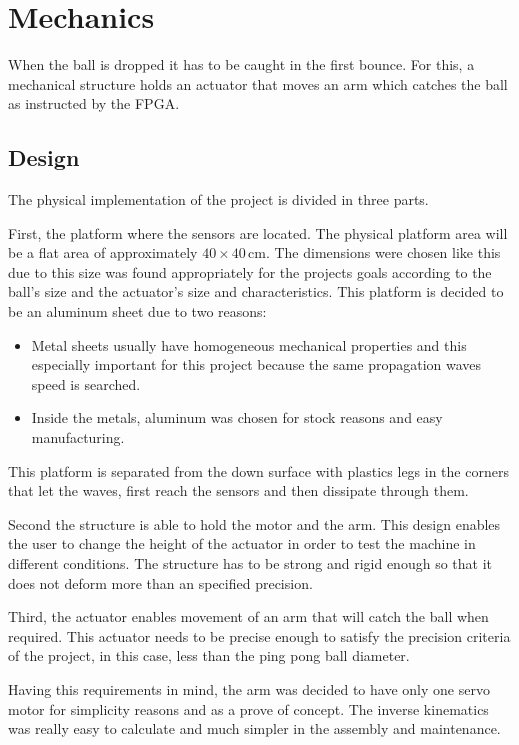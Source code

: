 \chapter{Mechanics} %
\label{chap:mechanics}
	When the ball is dropped it has to be caught in the first bounce. 
	For this, a mechanical structure holds an actuator that moves an arm which catches the ball as instructed by the FPGA.

	\section{Design} %
	\label{sec:mechanics_design}
		The physical implementation of the project is divided in three parts.

		First, the platform where the sensors are located. 
		The physical platform area will be a flat area of approximately $40\times40\,\si{\centi\meter}$.
		The dimensions were chosen like this due to this size was found appropriately for the projects goals according to the ball's size and the actuator's size and characteristics.
		This platform is decided to be an aluminum sheet due to two reasons: 
		\begin{itemize}
			\item Metal sheets usually have homogeneous mechanical properties and this especially important for this project because the same propagation waves speed is searched.
			\item Inside the metals, aluminum was chosen for stock reasons and easy manufacturing. 
		\end{itemize}
		This platform is separated from the down surface with plastics legs in the corners that let the waves, first reach the sensors and then dissipate through them.

		Second the structure is able to hold the motor and the arm. This design enables the user to change the height of the actuator in order to test the machine in different conditions. 
		The structure has to be strong and rigid enough so that it does not deform more than an specified precision.

		Third, the actuator enables movement of an arm that will catch the ball when required. 
		This actuator needs to be precise enough to satisfy the precision criteria of the project, in this case, less than the ping pong ball diameter. 
			
		Having this requirements in mind, the arm was decided to have only one servo motor for simplicity reasons and as a prove of concept. 
		The inverse kinematics was really easy to calculate and much simpler in the assembly and maintenance.
	
